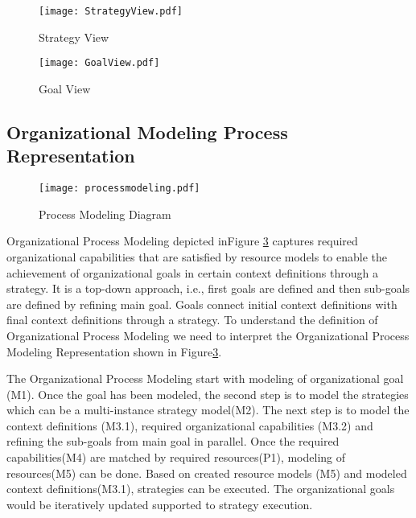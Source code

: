 \begin{figure}
	\centering
	\texttt{[image: StrategyView.pdf]}
	\caption{Strategy View}
	\label{fig:strategyview}
\end{figure}

\begin{figure}
	\centering
	\texttt{[image: GoalView.pdf]}
	\caption{Goal View}
	\label{fig:goalview}
\end{figure}

\subsection{Organizational Modeling Process Representation}
\begin{figure}
	\centering
	\texttt{[image: processmodeling.pdf]}
	\caption{Process Modeling Diagram}
	\label{fig:processdiagram}
\end{figure}

\hspace{4ex} Organizational Process Modeling depicted inFigure \ref{fig:processdiagram} captures required organizational capabilities that are satisfied by resource models  to enable the achievement of organizational goals in certain context definitions through a strategy. It is a top-down approach, i.e., first goals are defined and then sub-goals  are defined by refining main goal. Goals connect initial context definitions with final context definitions through a strategy.  To understand the definition of Organizational Process Modeling we need to interpret the Organizational Process Modeling Representation shown in Figure\ref{fig:processdiagram}. 

\hspace{4ex} The Organizational Process Modeling start with modeling of organizational goal (M1). Once the goal has been modeled, the second step is to model the strategies which can be a multi-instance strategy model(M2). The next step is to model the context definitions (M3.1), required organizational capabilities (M3.2) and refining the sub-goals from main goal in parallel. Once the required capabilities(M4) are matched by required resources(P1), modeling of resources(M5) can be done.  Based on created resource models (M5) and modeled context definitions(M3.1), strategies can be executed. The organizational goals would be iteratively updated supported to strategy execution.  


